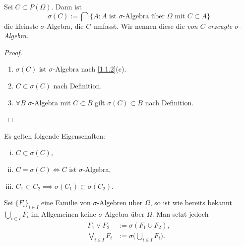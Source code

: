 \begin{lem} \label{1.1.3}
	Sei $C \subset P(\Omega)$.
	Dann ist
	\[
		\sigma(C)
		:= \bigcap \Big\{ A : \text{$A$ ist $\sigma$-Algebra über $\Omega$ mit $C \subset A$} \Big\}
	\]
	die kleinste $\sigma$-Algebra, die $C$ umfasst.
	Wir nennen diese die \emph{von $C$ erzeugte $\sigma$-Algebra}.
	\begin{proof}
		\begin{enumerate}[1)]
			\item
				$\sigma(C)$ ist $\sigma$-Algebra nach \ref{1.1.2}(c).
			\item
				$C \subset \sigma(C)$ nach Definition.
			\item
				$\forall B$ $\sigma$-Algebra mit $C \subset B$ gilt $\sigma(C) \subset B$ nach Definition.
		\end{enumerate}
	\end{proof}
\end{lem}

\begin{nt} \label{1.1.4}
	Es gelten folgende Eigenschaften:
	\begin{enumerate}[(i)]
		\item
			$C \subset \sigma(C)$,
		\item
			$C = \sigma(C) \iff C$ ist $\sigma$-Algebra,
		\item
			$C_1 \subset C_2 \implies \sigma(C_1) \subset \sigma(C_2)$.
	\end{enumerate}
\end{nt}

\begin{nt} \label{1.1.5}
	Sei $\{F_i\}_{i\in I}$ eine Familie von $\sigma$-Algebren über $\Omega$, so ist wie bereits bekannt $\bigcup_{i\in I} F_i$ im Allgemeinen keine $\sigma$-Algebra über $\Omega$.
	Man setzt jedoch
	\begin{align*}
		F_1 \vee F_2 &:= \sigma(F_1 \cup F_2), \\
		\bigvee_{i\in I} F_i &:= \sigma\bigg( \bigcup_{i\in I} F_i \bigg).
	\end{align*}
\end{nt}

